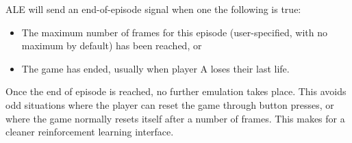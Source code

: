 \documentclass[12pt]{article}
\begin{document}
ALE will send an end-of-episode signal when one the following is true:

\begin{itemize}
  \item{The maximum number of frames for this episode (user-specified, with no maximum by default) has been reached, or}
  \item{The game has ended, usually when player A loses their last life.}
\end{itemize}

Once the end of episode is reached, no further emulation takes place. This avoids odd situations
where the player can reset the game through button presses, or where the game normally resets itself
after a number of frames. This makes for a cleaner reinforcement learning interface.
\end{document}
